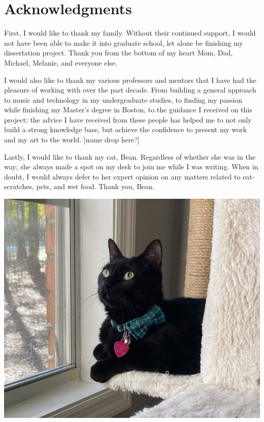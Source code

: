 \chapter{Acknowledgments}

First, I would like to thank my family. Without their continued support, I would not have been able to make it into graduate school, let alone be finishing my dissertation project. Thank you from the bottom of my heart Mom, Dad, Michael, Melanie, and everyone else. 

I would also like to thank my various professors and mentors that I have had the pleasure of working with over the past decade. From building a general approach to music and technology in my undergraduate studies, to finding my passion while finishing my Master’s degree in Boston, to the guidance I received on this project; the advice I have received from these people has helped me to not only build a strong knowledge base, but achieve the confidence to present my work and my art to the world. [name drop here?]

Lastly, I would like to thank my cat, Bean. Regardless of whether she was in the way; she always made a spot on my desk to join me while I was writing. When in doubt, I would always defer to her expert opinion on any matters related to eat-scratches, pets, and wet food. Thank you, Bean.

\vspace{10mm}

\begin{center}
    \includegraphics[scale=0.12]{bean.jpeg}
\end{center}



